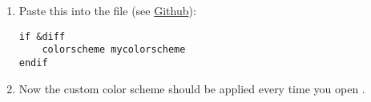 \begin{enumerate}[a)]
\begin{enumerate}[1.]
        \item Paste this into the file (see \href{https://github.com/robinhellmers/computer_setup/blob/master/vimdiff_colors/vimrc}{Github}):
\begin{verbatim}
if &diff
    colorscheme mycolorscheme
endif
\end{verbatim}
        
        \item Now the custom color scheme should be applied every time you open .
    \end{enumerate}
    
\end{enumerate}


